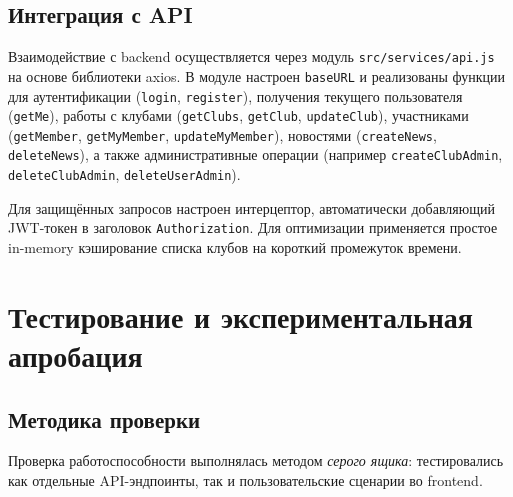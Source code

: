 \documentclass[utf8, russian]{eskdtext}
\let\stdsection\section
\renewcommand \section{\newpage\stdsection}
\begin{document}
\subsection{Интеграция с API}
Взаимодействие с backend осуществляется через модуль \texttt{src/services/api.js} на основе библиотеки axios. В модуле настроен \texttt{baseURL} и реализованы функции для аутентификации (\texttt{login}, \texttt{register}), получения текущего пользователя (\texttt{getMe}), работы с клубами (\texttt{getClubs}, \texttt{getClub}, \texttt{updateClub}), участниками (\texttt{getMember}, \texttt{getMyMember}, \texttt{updateMyMember}), новостями (\texttt{createNews}, \texttt{deleteNews}), а также административные операции (например \texttt{createClubAdmin}, \texttt{deleteClubAdmin}, \texttt{deleteUserAdmin}).

Для защищённых запросов настроен интерцептор, автоматически добавляющий JWT-токен в заголовок \texttt{Authorization}. Для оптимизации применяется простое in-memory кэширование списка клубов на короткий промежуток времени.

\section{Тестирование и экспериментальная апробация}
\subsection{Методика проверки}
Проверка работоспособности выполнялась методом \textit{серого ящика}: тестировались как отдельные API-эндпоинты, так и пользовательские сценарии во frontend.
\end{document}
